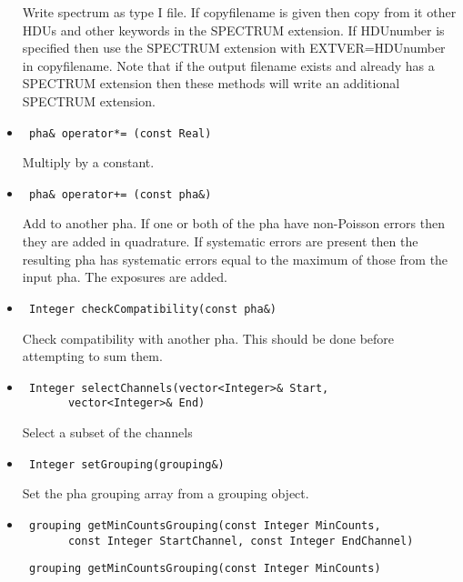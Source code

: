 \documentclass[11pt]{book}
\begin{document}
\begin{itemize}
          Write spectrum as type I file. If copyfilename is given then
          copy from it other HDUs and other keywords in the SPECTRUM
          extension. If HDUnumber is specified then use the SPECTRUM
          extension with EXTVER=HDUnumber in copyfilename. Note that 
          if the output filename exists and already has a SPECTRUM 
          extension then these methods will write an
          additional SPECTRUM extension.

\item  \begin{verbatim} pha& operator*= (const Real) \end{verbatim}

           Multiply by a constant.

\item  \begin{verbatim} pha& operator+= (const pha&) \end{verbatim}

           Add to another pha. If one or both of the pha have
           non-Poisson errors then they are added in quadrature. If
           systematic errors are present then the resulting pha has
           systematic errors equal to the maximum of those from the
           input pha. The exposures are added.

\item  \begin{verbatim} Integer checkCompatibility(const pha&) \end{verbatim}

           Check compatibility with another pha. This should be done
           before attempting to sum them.

\item  \begin{verbatim} Integer selectChannels(vector<Integer>& Start, 
       vector<Integer>& End) \end{verbatim}

           Select a subset of the channels

\item  \begin{verbatim} Integer setGrouping(grouping&) \end{verbatim}

           Set the pha grouping array from a grouping object.

\item  \begin{verbatim} grouping getMinCountsGrouping(const Integer MinCounts, 
       const Integer StartChannel, const Integer EndChannel) \end{verbatim}
       \begin{verbatim} grouping getMinCountsGrouping(const Integer MinCounts) \end{verbatim}


\end{itemize}
\end{document}
